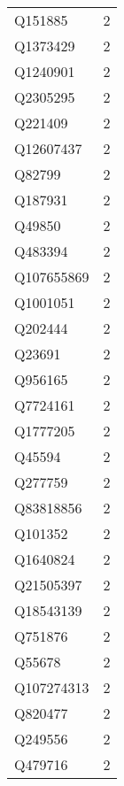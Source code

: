 \begin{tabular}{lr}
     Q151885 &                             2 \\
    Q1373429 &                             2 \\
    Q1240901 &                             2 \\
    Q2305295 &                             2 \\
     Q221409 &                             2 \\
   Q12607437 &                             2 \\
      Q82799 &                             2 \\
     Q187931 &                             2 \\
      Q49850 &                             2 \\
     Q483394 &                             2 \\
  Q107655869 &                             2 \\
    Q1001051 &                             2 \\
     Q202444 &                             2 \\
      Q23691 &                             2 \\
     Q956165 &                             2 \\
    Q7724161 &                             2 \\
    Q1777205 &                             2 \\
      Q45594 &                             2 \\
     Q277759 &                             2 \\
   Q83818856 &                             2 \\
     Q101352 &                             2 \\
    Q1640824 &                             2 \\
   Q21505397 &                             2 \\
   Q18543139 &                             2 \\
     Q751876 &                             2 \\
      Q55678 &                             2 \\
  Q107274313 &                             2 \\
     Q820477 &                             2 \\
     Q249556 &                             2 \\
     Q479716 &                             2 \\

\end{tabular}
